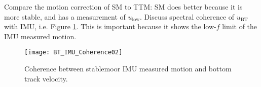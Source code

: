 Compare the motion correction of SM to TTM: SM does better because it is more stable, and has a measurement of $u_\mathrm{low}$. Discuss spectral coherence of $u_\mathrm{BT}$ with IMU, i.e. Figure \ref{fig:SM_coh}. This is important because it shows the low-$f$ limit of the IMU measured motion.

\begin{figure}[t]
  \centering
  \texttt{[image: BT\_IMU\_Coherence02]}
  \caption{Coherence between stablemoor IMU measured motion and bottom track velocity.}
  \label{fig:SM_coh}
\end{figure}



